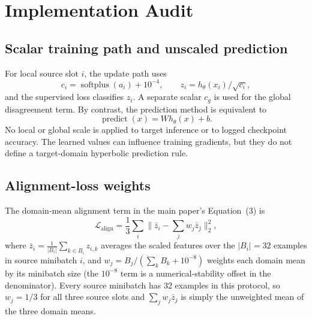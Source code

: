 \documentclass[10pt]{article}
\begin{document}
\begin{table}[H]
\centering
\caption{Source-selected held-out target \texttt{in}-split sensitivity. These
values never enter checkpoint selection.}
\label{tab:target-in}
\small
\resizebox{\textwidth}{!}{%
}
\end{table}

\section{Implementation Audit}
\label{sec:audit}

\subsection{Scalar training path and unscaled prediction}

For local source slot $i$, the update path uses
\begin{equation}
c_i=\operatorname{softplus}(a_i)+10^{-4},\qquad
z_i=h_\theta(x_i)/\sqrt{c_i},
\end{equation}
and the supervised loss classifies $z_i$. A separate scalar $c_g$ is used for
the global disagreement term. By contrast, the prediction method is equivalent
to
\begin{equation}
\operatorname{predict}(x)=W h_\theta(x)+b.
\end{equation}
No local or global scale is applied to target inference or to logged checkpoint
accuracy. The learned values can influence training gradients, but they do not
define a target-domain hyperbolic prediction rule.

\subsection{Alignment-loss weights}

The domain-mean alignment term in the main paper's Equation~(3) is
\begin{equation}
\mathcal L_{\mathrm{align}}=\frac13\sum_i\Big\|\bar z_i-\sum_jw_j\bar
z_j\Big\|_2^2,
\end{equation}
where $\bar z_i=\frac{1}{|B_i|}\sum_{k\in B_i}z_{i,k}$ averages the scaled
features over the $|B_i|=32$ examples in source minibatch $i$, and
$w_j=B_j/(\sum_kB_k+10^{-8})$ weights each domain mean by its minibatch size
(the $10^{-8}$ term is a numerical-stability offset in the denominator). Every
source minibatch has 32 examples in this protocol, so $w_j=1/3$ for all
three source slots and $\sum_jw_j\bar z_j$ is simply the unweighted mean of
the three domain means.
\end{document}
